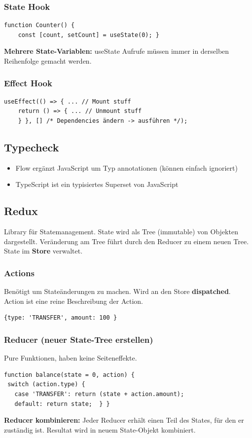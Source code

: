 \subsubsection{State Hook}
\begin{lstlisting}
function Counter() {
    const [count, setCount] = useState(0); }
\end{lstlisting}
\textbf{Mehrere State-Variablen:} useState Aufrufe müssen immer in derselben Reihenfolge gemacht werden.

\subsubsection{Effect Hook}
\begin{lstlisting}
useEffect(() => { ... // Mount stuff
    return () => { ... // Unmount stuff
    } }, [] /* Dependencies ändern -> ausführen */);
\end{lstlisting}

\subsection{Typecheck}
\begin{itemize}
    \item Flow ergänzt JavaScript um Typ annotationen (können einfach ignoriert)
    \item TypeScript ist ein typisiertes Superset von JavaScript
\end{itemize}

\subsection{Redux}
Library für Statemanagement. State wird als Tree (immutable) von Objekten dargestellt. Veränderung am Tree führt durch den Reducer zu einem neuen Tree. State im \textbf{Store} verwaltet.

\subsubsection{Actions}
Benötigt um Stateänderungen zu machen. Wird an den Store \textbf{dispatched}. Action ist eine reine Beschreibung der Action.
\begin{lstlisting}
{type: 'TRANSFER', amount: 100 }
\end{lstlisting}

\subsubsection{Reducer (neuer State-Tree erstellen)}
Pure Funktionen, haben keine Seiteneffekte.
\begin{lstlisting}
function balance(state = 0, action) {
 switch (action.type) {
   case 'TRANSFER': return (state + action.amount);
   default: return state;  } }
\end{lstlisting}
\textbf{Reducer kombinieren:} Jeder Reducer erhält einen Teil des States, für den er zuständig ist. Resultat wird in neuem State-Objekt kombiniert.

